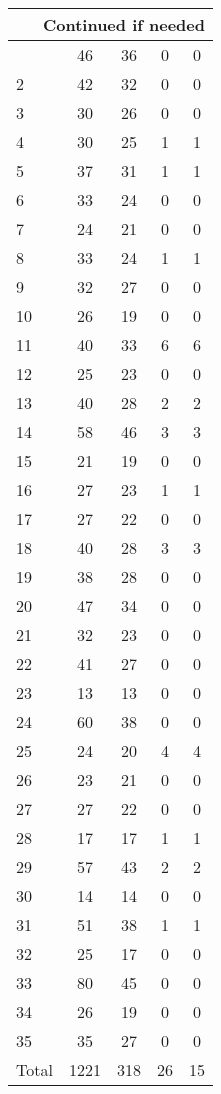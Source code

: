 \begin{center}
\begin{longtable}{l|c|c|c|c}
\hline \multicolumn{5}{|r|}{{Continued if needed}} \\ \hline
\endfoot 
1 & 46 & 36 & 0 & 0\\ \hline
2 & 42 & 32 & 0 & 0\\ \hline
3 & 30 & 26 & 0 & 0\\ \hline
4 & 30 & 25 & 1 & 1\\ \hline
5 & 37 & 31 & 1 & 1\\ \hline
6 & 33 & 24 & 0 & 0\\ \hline
7 & 24 & 21 & 0 & 0\\ \hline
8 & 33 & 24 & 1 & 1\\ \hline
9 & 32 & 27 & 0 & 0\\ \hline
10 & 26 & 19 & 0 & 0\\ \hline
11 & 40 & 33 & 6 & 6\\ \hline
12 & 25 & 23 & 0 & 0\\ \hline
13 & 40 & 28 & 2 & 2\\ \hline
14 & 58 & 46 & 3 & 3\\ \hline
15 & 21 & 19 & 0 & 0\\ \hline
16 & 27 & 23 & 1 & 1\\ \hline
17 & 27 & 22 & 0 & 0\\ \hline
18 & 40 & 28 & 3 & 3\\ \hline
19 & 38 & 28 & 0 & 0\\ \hline
20 & 47 & 34 & 0 & 0\\ \hline
21 & 32 & 23 & 0 & 0\\ \hline
22 & 41 & 27 & 0 & 0\\ \hline
23 & 13 & 13 & 0 & 0\\ \hline
24 & 60 & 38 & 0 & 0\\ \hline
25 & 24 & 20 & 4 & 4\\ \hline
26 & 23 & 21 & 0 & 0\\ \hline
27 & 27 & 22 & 0 & 0\\ \hline
28 & 17 & 17 & 1 & 1\\ \hline
29 & 57 & 43 & 2 & 2\\ \hline
30 & 14 & 14 & 0 & 0\\ \hline
31 & 51 & 38 & 1 & 1\\ \hline
32 & 25 & 17 & 0 & 0\\ \hline
33 & 80 & 45 & 0 & 0\\ \hline
34 & 26 & 19 & 0 & 0\\ \hline
35 & 35 & 27 & 0 & 0\\ \hline
Total & 1221 & 318 & 26 & 15
\end{longtable}
\end{center}



